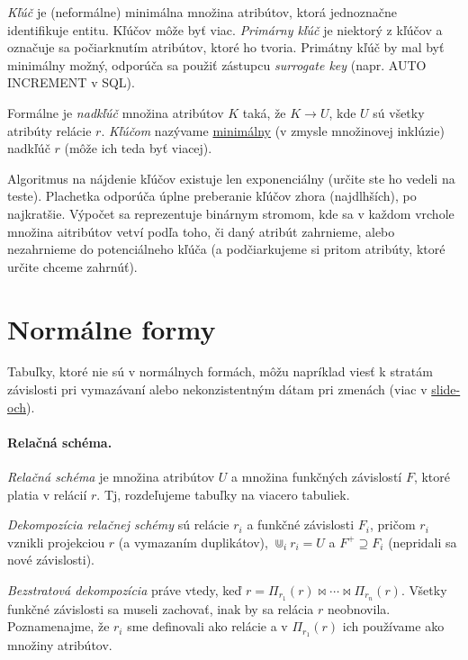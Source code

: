 \documentclass[10pt,a4paper]{article}
\begin{document}
\emph{Kľúč} je (neformálne) minimálna množina atribútov, ktorá
jednoznačne identifikuje entitu. Kľúčov môže byť viac. \emph{Primárny
kľúč} je niektorý z kľúčov a označuje sa počiarknutím atribútov,
ktoré ho tvoria. Primátny kľúč by mal byť minimálny možný, odporúča sa použiť zástupcu \emph{surrogate key} (napr. AUTO INCREMENT v SQL). 

Formálne je \emph{nadkľúč} množina atribútov $K$ taká, že $K \rightarrow U$, kde $U$ sú všetky atribúty relácie $r$. \emph{Kľúčom} nazývame \underline{minimálny} (v zmysle množinovej inklúzie) nadkľúč $r$ (môže ich teda byť viacej).

Algoritmus na nájdenie kľúčov existuje len exponenciálny (určite ste ho vedeli na teste). Plachetka odporúča úplne preberanie kľúčov zhora (najdlhších), po najkratšie. Výpočet sa reprezentuje binárnym stromom, kde sa v každom vrchole množina aitribútov vetví podľa toho, či  daný atribút zahrnieme, alebo nezahrnieme do potenciálneho kľúča (a podčiarkujeme si pritom atribúty, ktoré určite chceme zahrnúť). 

\section{Normálne formy} 

Tabuľky, ktoré nie sú v normálnych formách, môžu napríklad viesť k stratám závislosti pri vymazávaní alebo nekonzistentným dátam pri zmenách (viac v \href{http://www.dcs.fmph.uniba.sk/~plachetk/TEACHING/DB2011/db2011_8.pdf}{slide-och}).

\paragraph{Relačná schéma.}
\emph{Relačná schéma} je množina atribútov $U$ a množina funkčných závislostí $F$, ktoré platia v relácií $r$. Tj, rozdeľujeme tabuľky na viacero tabuliek. 

\emph{Dekompozícia relačnej schémy} sú relácie $r_i$ a funkčné závislosti $F_i$, pričom $r_i$ vznikli projekciou $r$ (a vymazaním duplikátov), $\Cup_i r_i = U$ a $F^+ \supseteq F_i$ (nepridali sa nové závislosti).

\emph{Bezstratová dekompozícia} práve vtedy, keď $r = \Pi_{r_1}(r) \Join \cdots \Join \Pi_{r_n}(r)$. Všetky funkčné závislosti sa museli zachovať, inak by sa relácia $r$ neobnovila. Poznamenajme, že $r_i$ sme definovali ako relácie a v $\Pi_{r_1}(r) $ ich používame ako množiny atribútov. 
\end{document}
